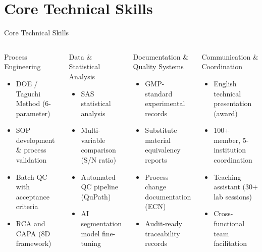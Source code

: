 \documentclass[aspectratio=169,10pt]{beamer}
\begin{document}
\section{Core Technical Skills}
\begin{frame}{Core Technical Skills}
  \begin{columns}[T]
      \begin{block}{Process Engineering}
        \small
        \begin{itemize}
          \item DOE / Taguchi Method (6-parameter)
          \item SOP development \& process validation
          \item Batch QC with acceptance criteria
          \item RCA and CAPA (8D framework)
        \end{itemize}
      \end{block}
      \vspace{0.1cm}
      \begin{block}{Data \& Statistical Analysis}
        \small
        \begin{itemize}
          \item SAS statistical analysis
          \item Multi-variable comparison (S/N ratio)
          \item Automated QC pipeline (QuPath)
          \item AI segmentation model fine-tuning
        \end{itemize}
      \end{block}

      \begin{block}{Documentation \& Quality Systems}
        \small
        \begin{itemize}
          \item GMP-standard experimental records
          \item Substitute material equivalency reports
          \item Process change documentation (ECN)
          \item Audit-ready traceability records
        \end{itemize}
      \end{block}
      \vspace{0.1cm}
      \begin{block}{Communication \& Coordination}
        \small
        \begin{itemize}
          \item English technical presentation (award)
          \item 100+ member, 5-institution coordination
          \item Teaching assistant (30+ lab sessions)
          \item Cross-functional team facilitation
        \end{itemize}
      \end{block}
  \end{columns}
\end{frame}
\end{document}
